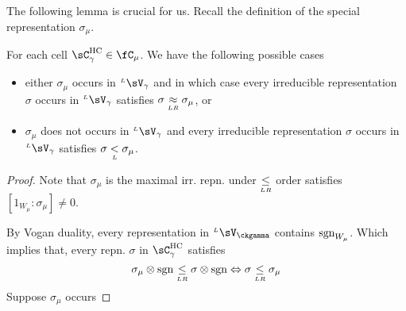 \documentclass[counting_main.tex]{subfiles}
\begin{document}
The following lemma is crucial for us.
Recall the definition of  the special representation $\sigma_{\mu}$.
\begin{lem}
For each cell $\CHC_{\gamma}\in \fC_{\mu}$.
We have the following possible cases
\begin{itemize}
  \item either
        $\sigma_{\mu}$ occurs in $\LV_{\gamma}$ and in which case every irreducible representation $\sigma$ occurs in  $\LV_{\gamma}$
        satisfies $\sigma\mathrel{\mathop{\approx}\limits_{\scriptscriptstyle LR}} \sigma_{\mu}$, or
  \item $\sigma_{\mu}$ does not occurs in $\LV_{\gamma}$ and every irreducible representation $\sigma$ occurs in  $\LV_{\gamma}$
        satisfies $\sigma\mathrel{\mathop{<}\limits_{\scriptscriptstyle L}} \sigma_{\mu}$.
\end{itemize}
\end{lem}
\begin{proof}
  Note that $\sigma_{\mu}$ is the maximal irr. repn. under $\mathrel{\mathop{\leq}\limits_{\scriptscriptstyle LR}}$ order
  satisfies $[1_{W_{\mu}}: \sigma_{\mu}]\neq 0$.

  By Vogan duality, every representation in $\LV_{\ckgamma}$ contains
  $\operatorname{sgn}_{W_{\mu}}$.
  Which implies that, every repn. $\sigma$ in $\CHC_{\gamma}$  satisfies
  \[
   \sigma_{\mu}\otimes \operatorname{sgn}\mathrel{\mathop{\leq}\limits_{\scriptscriptstyle LR}} \sigma\otimes \operatorname{sgn}
   \Leftrightarrow \sigma \mathrel{\mathop{\leq}\limits_{\scriptscriptstyle LR}} \sigma_{\mu}
  \]
  Suppose $\sigma_{\mu}$ occurs

\end{proof}
\end{document}
